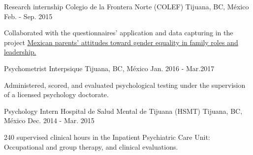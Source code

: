 \begin{cventries}
{\begin{cvitems}
            \end{cvitems}
        }
     \cventry
        {Research internship}
        {Colegio de la Frontera Norte (COLEF)}
        {Tijuana, BC, México}
        {Feb. - Sep. 2015}
        {
            \begin{cvitems}
            \item {Collaborated with the questionnaires' application and
                    data capturing in the project
                    \href{https://estudiosdemograficosyurbanos.colmex.mx/index.php/edu/article/view/1791/pdf}
                    {Mexican parents’ attitudes toward gender equality in family roles and leadership.}
            }
            \end{cvitems}
        }
\end{cventries}
\vspace{-3mm}
\begin{cventries}
    \cventry
        {Psychometrist}
        {Interpsique}
        {Tijuana, BC, México}
        {Jan. 2016 - Mar.2017}
        {
            \begin{cvitems}
                \item {Administered, scored, and evaluated psychological testing under the supervision of a licensed psychology doctorate.}
            \end{cvitems}
        }
    \cventry
        {Psychology Intern}
        {Hospital de Salud Mental de Tijuana (HSMT)}
        {Tijuana, BC, México}
        {Dec. 2014 - Mar. 2015}
        {
            \begin{cvitems}
                \item {240 supervised clinical hours in the Inpatient
                    Psychiatric Care Unit: Occupational and group therapy, and
                clinical evaluations.}
            \end{cvitems}
        }
\end{cventries}
